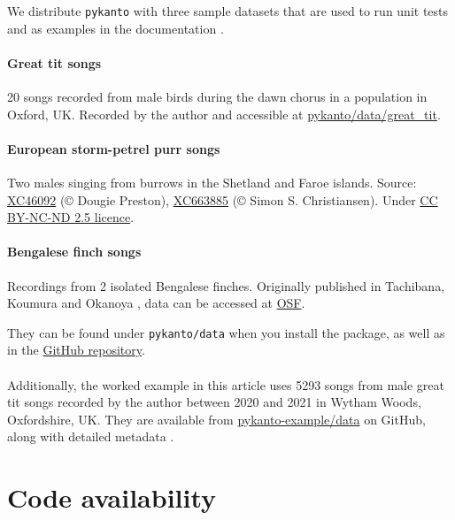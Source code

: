 We distribute \texttt{pykanto} with three sample datasets that are used to run unit tests
and as examples in the documentation \parencite{nilo_pykanto_2023}.

\paragraph{Great tit songs} 20 songs recorded from male birds during the dawn chorus in a
population in Oxford, UK. Recorded by the author and accessible at \href{https://github.com/nilomr/pykanto/tree/main/pykanto/data/segmented/great_tit}{pykanto/data/great\_tit}.

\paragraph{European storm-petrel purr songs} Two males singing from burrows in the Shetland
and Faroe islands. Source: \href{https://xeno-canto.org/46092}{XC46092} (©
Dougie Preston), \href{https://xeno-canto.org/663885}{XC663885} (© Simon S.
Christiansen). Under
\href{https://creativecommons.org/licenses/by-nc-nd/2.5/}{CC BY-NC-ND 2.5
licence}.

\paragraph{Bengalese finch songs} Recordings from 2 isolated Bengalese finches. Originally
published in Tachibana, Koumura and Okanoya \parencite{tachibana2015}, data can be
accessed at \href{https://osf.io/r6paq/}{OSF}.\par

They can be found under \texttt{pykanto/data} when you install the package, as well as in the \href{https://github.com/nilomr/pykanto}{GitHub repository}.

\paragraph{}Additionally, the worked example in this article uses 5293 songs from male great tit songs recorded by the author between 2020 and 2021 in Wytham Woods, Oxfordshire, UK. They are available from \href{https://github.com/nilomr/pykanto-example/tree/main/data/segmented/pykanto-example}{pykanto-example/data} on GitHub, along with detailed metadata \parencite{nilo_pykanto_example_2023}.

\section{Code availability}

